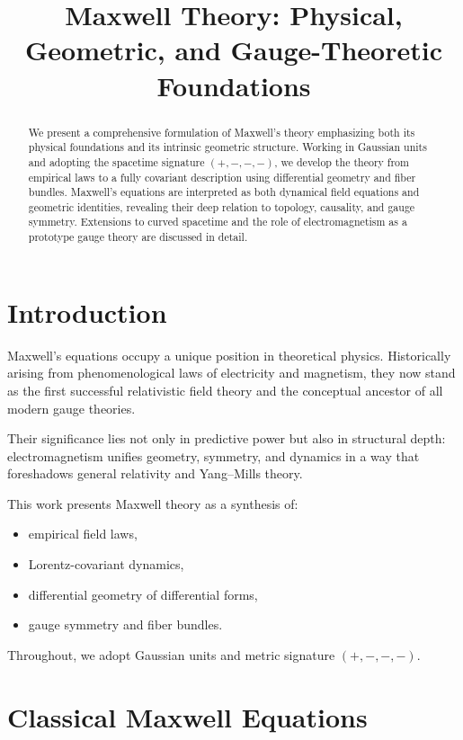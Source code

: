 \documentclass[12pt]{article}
\title{\textbf{Maxwell Theory: Physical, Geometric, and Gauge-Theoretic Foundations}}
\author{ }
\date{}
\begin{document}
\maketitle

\begin{abstract}
We present a comprehensive formulation of Maxwell’s theory emphasizing both its physical foundations and its intrinsic geometric structure. Working in Gaussian units and adopting the spacetime signature $(+,-,-,-)$, we develop the theory from empirical laws to a fully covariant description using differential geometry and fiber bundles. Maxwell’s equations are interpreted as both dynamical field equations and geometric identities, revealing their deep relation to topology, causality, and gauge symmetry. Extensions to curved spacetime and the role of electromagnetism as a prototype gauge theory are discussed in detail.
\end{abstract}

\tableofcontents

\section{Introduction}

Maxwell’s equations occupy a unique position in theoretical physics. Historically arising from phenomenological laws of electricity and magnetism, they now stand as the first successful relativistic field theory and the conceptual ancestor of all modern gauge theories.

Their significance lies not only in predictive power but also in structural depth: electromagnetism unifies geometry, symmetry, and dynamics in a way that foreshadows general relativity and Yang--Mills theory.

This work presents Maxwell theory as a synthesis of:
\begin{itemize}
\item empirical field laws,
\item Lorentz-covariant dynamics,
\item differential geometry of differential forms,
\item gauge symmetry and fiber bundles.
\end{itemize}

Throughout, we adopt Gaussian units and metric signature $(+,-,-,-)$.


\section{Classical Maxwell Equations}
\end{document}
